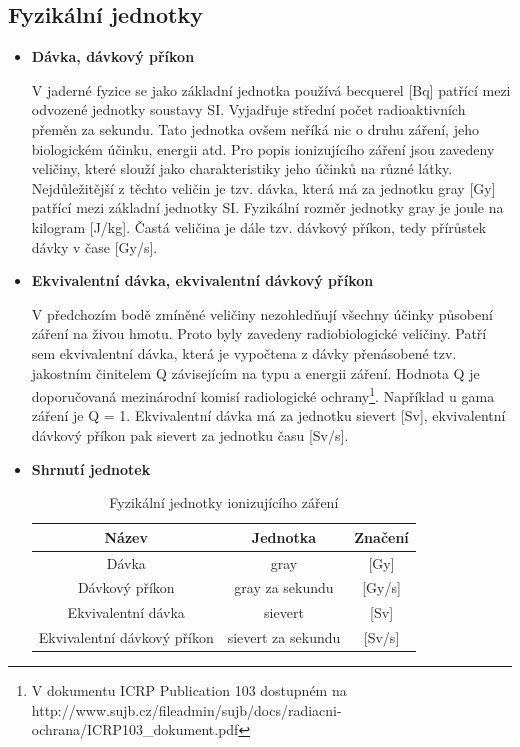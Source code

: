 \subsection{Fyzikální jednotky} %

\begin{itemize}
	\item \textbf{Dávka, dávkový příkon}
	
		V jaderné fyzice se jako základní jednotka používá becquerel [Bq] patřící mezi odvozené jednotky soustavy SI. Vyjadřuje střední počet radioaktivních přeměn za sekundu. Tato jednotka ovšem neříká nic o druhu záření, jeho biologickém účinku, energii atd. Pro popis ionizujícího záření jsou zavedeny veličiny, které slouží jako charakteristiky jeho účinků na různé látky. Nejdůležitější z těchto veličin je tzv. dávka, která má za jednotku gray [Gy] patřící mezi základní jednotky SI. Fyzikální rozměr jednotky gray je joule na kilogram [J/kg]. Častá veličina je dále tzv. dávkový příkon, tedy přírůstek dávky v čase [Gy/s]. 
		
	\item \textbf{Ekvivalentní dávka, ekvivalentní dávkový příkon}

	 	V předchozím bodě zmíněné veličiny nezohledňují všechny účinky působení záření na živou hmotu. Proto byly zavedeny radiobiologické veličiny. Patří sem ekvivalentní dávka, která je vypočtena z dávky přenásobené tzv. jakostním činitelem Q závisejícím na typu a energii záření. Hodnota Q je doporučovaná mezinárodní komisí radiologické ochrany\footnote{V dokumentu ICRP Publication 103 dostupném na http://www.sujb.cz/fileadmin/sujb/docs/radiacni-ochrana/ICRP103\_dokument.pdf}. Například u gama záření je Q = 1. Ekvivalentní dávka má za jednotku sievert [Sv], ekvivalentní dávkový příkon pak sievert za jednotku času [Sv/s].
	 	
	\item \textbf{Shrnutí jednotek}
	
		\begin{table}[h!]
			\centering
			\caption{Fyzikální jednotky ionizujícího záření}
			\label{tab:tabulkaJednotek}
			\begin{tabular}{|c|c|c|}
				\hline
				\textbf{Název}              & \textbf{Jednotka}  & \textbf{Značení} \\ \hline
				Dávka                       & gray               & {[}Gy{]}         \\ \hline
				Dávkový příkon              & gray za sekundu    & {[}Gy/s{]}       \\ \hline
				Ekvivalentní dávka          & sievert            & {[}Sv{]}         \\ \hline
				Ekvivalentní dávkový příkon & sievert za sekundu & {[}Sv/s{]}       \\ \hline
			\end{tabular}
		\end{table}
\end{itemize}

